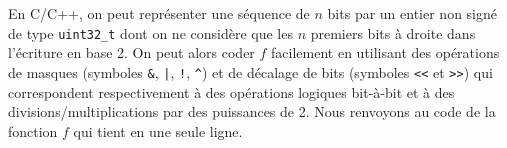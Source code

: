 \begin{rem}
En C/C++, on peut repr\'esenter une s\'equence de $n$ bits par un entier non sign\'e de type \verb+uint32_t+ dont on ne consid\`ere que les $n$ premiers bits \`a droite dans l'\'ecriture en base 2. On peut alors coder $f$ facilement en utilisant des op\'erations de \og masques \fg{} (symboles \verb+&+, \verb+|+, \verb+!+, \verb+^+) et de d\'ecalage de bits (symboles \verb+<<+ et \verb+>>+) qui correspondent respectivement \`a des op\'erations logiques bit-\`a-bit et \`a des divisions/multiplications par des puissances de 2. Nous renvoyons au code de la fonction $f$ qui tient en une seule ligne.
\end{rem}